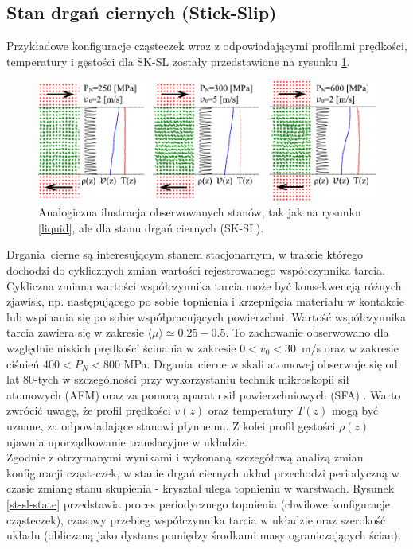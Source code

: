 \documentclass[12pt,a4paper,openright]{report} %
\begin{document}
\subsection{Stan drgań ciernych (Stick-Slip)}
Przykładowe konfiguracje cząsteczek wraz z odpowiadającymi profilami prędkości, temperatury i gęstości dla SK-SL zostały przedstawione na rysunku \ref{stick-slip}. 
%
\begin{figure}
\centering
\includegraphics[width=160mm]{rysunki/PRE16_fig4.pdf}
\caption{Analogiczna ilustracja obserwowanych stanów, tak jak na rysunku \ref{liquid}, ale dla stanu drgań ciernych (SK-SL).}
\label{stick-slip}
\end{figure}
%
Drgania~cierne są interesującym stanem stacjonarnym, w trakcie którego dochodzi do cyklicznych zmian wartości rejestrowanego współczynnika tarcia. Cykliczna zmiana wartości współczynnika tarcia może być konsekwencją różnych zjawisk, np. następującego po sobie topnienia i krzepnięcia materiału w kontakcie lub wspinania się po sobie współpracujących powierzchni. Wartość współczynnika tarcia zawiera się w zakresie \linebreak $\langle \mu \rangle \simeq 0.25 - 0.5$. To zachowanie obserwowano dla względnie niskich prędkości ścinania w zakresie $0<v_0<30$~m/s oraz w zakresie ciśnień $400< P_N < 800$ MPa. \linebreak Drgania~cierne w skali atomowej obserwuje się od lat 80-tych w szczególności przy wykorzystaniu technik mikroskopii sił atomowych (AFM) oraz za pomocą aparatu sił powierzchniowych (SFA) \cite{Israelachvili1988, Homola1989, McGuiggan1989, Gee1990}. Warto zwrócić uwagę, że profil prędkości $v(z)$ oraz temperatury $T(z)$ mogą być uznane, za odpowiadające stanowi płynnemu. Z kolei profil gęstości $\rho(z)$ ujawnia uporządkowanie translacyjne w układzie. \\
Zgodnie z otrzymanymi wynikami i wykonaną szczegółową analizą zmian konfiguracji cząsteczek, w stanie drgań ciernych układ przechodzi periodyczną w czasie zmianę stanu skupienia - kryształ ulega topnieniu w warstwach. 
%
Rysunek \ref{st-sl-state} przedstawia proces periodycznego topnienia (chwilowe konfiguracje cząsteczek), czasowy przebieg współczynnika tarcia w układzie oraz szerokość układu (obliczaną jako dystans pomiędzy środkami masy ograniczających ścian). 
\end{document}
